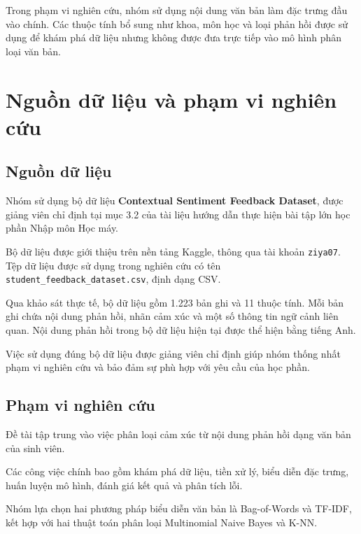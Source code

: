 Trong phạm vi nghiên cứu, nhóm sử dụng nội dung văn bản làm đặc trưng đầu vào chính. Các thuộc tính bổ sung như khoa, môn học và loại phản hồi được sử dụng để khám phá dữ liệu nhưng không được đưa trực tiếp vào mô hình phân loại văn bản.



\section{Nguồn dữ liệu và phạm vi nghiên cứu}

\subsection{Nguồn dữ liệu}

Nhóm sử dụng bộ dữ liệu \textbf{Contextual Sentiment Feedback Dataset}, được giảng viên chỉ định tại mục 3.2 của tài liệu hướng dẫn thực hiện bài tập lớn học phần Nhập môn Học máy.

Bộ dữ liệu được giới thiệu trên nền tảng Kaggle, thông qua tài khoản \texttt{ziya07}. Tệp dữ liệu được sử dụng trong nghiên cứu có tên \texttt{student\_feedback\_dataset.csv}, định dạng CSV.

Qua khảo sát thực tế, bộ dữ liệu gồm 1.223 bản ghi và 11 thuộc tính. Mỗi bản ghi chứa nội dung phản hồi, nhãn cảm xúc và một số thông tin ngữ cảnh liên quan. Nội dung phản hồi trong bộ dữ liệu hiện tại được thể hiện bằng tiếng Anh.

Việc sử dụng đúng bộ dữ liệu được giảng viên chỉ định giúp nhóm thống nhất phạm vi nghiên cứu và bảo đảm sự phù hợp với yêu cầu của học phần.



\subsection{Phạm vi nghiên cứu}

Đề tài tập trung vào việc phân loại cảm xúc từ nội dung phản hồi dạng văn bản của sinh viên.

Các công việc chính bao gồm khám phá dữ liệu, tiền xử lý, biểu diễn đặc trưng, huấn luyện mô hình, đánh giá kết quả và phân tích lỗi.

Nhóm lựa chọn hai phương pháp biểu diễn văn bản là Bag-of-Words và TF-IDF, kết hợp với hai thuật toán phân loại Multinomial Naive Bayes và K-NN.

